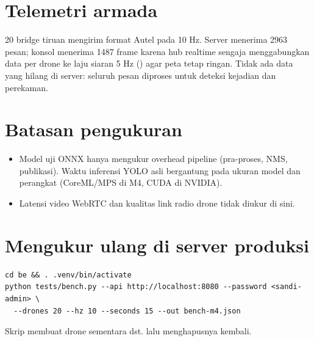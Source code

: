 \section{Telemetri armada}
20 bridge tiruan mengirim format Autel pada 10 Hz. Server menerima 2963 pesan; konsol menerima 1487 frame karena hub realtime sengaja menggabungkan data per drone ke laju siaran 5 Hz () agar peta tetap ringan. Tidak ada data yang hilang di server: seluruh pesan diproses untuk deteksi kejadian dan perekaman.

\section{Batasan pengukuran}
\begin{itemize}
\item Model uji ONNX hanya mengukur overhead pipeline (pra-proses, NMS, publikasi). Waktu inferensi YOLO asli bergantung pada ukuran model dan perangkat (CoreML/MPS di M4, CUDA di NVIDIA).
\item Latensi video WebRTC dan kualitas link radio drone tidak diukur di sini.
\end{itemize}

\section{Mengukur ulang di server produksi}
\begin{lstlisting}
cd be && . .venv/bin/activate
python tests/bench.py --api http://localhost:8080 --password <sandi-admin> \
  --drones 20 --hz 10 --seconds 15 --out bench-m4.json
\end{lstlisting}
Skrip membuat drone sementara  dst. lalu menghapusnya kembali.
